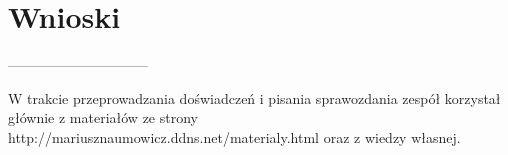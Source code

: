 \documentclass[polish,a4paper]{article}
\begin{document}
\section{Wnioski}
------------------------------





\begin{thebibliography}{9}

  W trakcie przeprowadzania doświadczeń i pisania sprawozdania zespół korzystał głównie z materiałów ze strony http://mariusznaumowicz.ddns.net/materialy.html oraz z wiedzy własnej.

\end{thebibliography}
\end{document}
